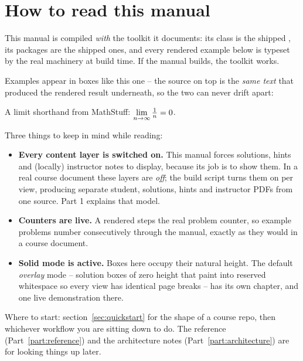 \section{How to read this manual}

This manual is compiled \emph{with} the toolkit it documents: its class is the
shipped , its packages are the shipped ones, and every
rendered example below is typeset by the real machinery at build time. If the
manual builds, the toolkit works.

Examples appear in boxes like this one -- the source on top is the \emph{same
text} that produced the rendered result underneath, so the two can never drift
apart:

\begin{manexample}
A limit shorthand from MathStuff:
$\lim\limits_{n \to \infty} \frac{1}{n} = 0$.
\end{manexample}

Three things to keep in mind while reading:

\begin{itemize}
  \item \textbf{Every content layer is switched on.} This manual forces
    solutions, hints and (locally) instructor notes to display, because its job
    is to show them. In a real course document these layers are \emph{off}; the
    build script turns them on per view, producing separate student, solutions,
    hints and instructor PDFs from one source. Part 1 explains that model.
  \item \textbf{Counters are live.} A rendered  steps the real
    problem counter, so example problems number consecutively through the
    manual, exactly as they would in a course document.
  \item \textbf{Solid mode is active.} Boxes here occupy their natural height.
    The default \emph{overlay} mode -- solution boxes of zero height that paint
    into reserved whitespace so every view has identical page breaks -- has its
    own chapter, and one live demonstration there.
\end{itemize}

Where to start: section~\ref{sec:quickstart} for the shape of a course
repo, then whichever workflow you are sitting down to do. The reference
(Part~\ref{part:reference}) and the architecture notes
(Part~\ref{part:architecture}) are for looking things up later.
